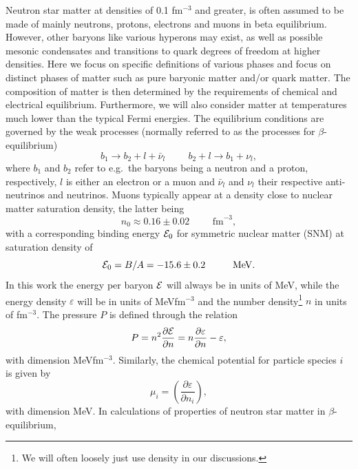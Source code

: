 \documentclass[%
oneside,                 %
final,                   %
10pt]{article}
\begin{document}
Neutron star matter
at densities of  0.1 fm$^{-3}$ and greater, is often assumed to 
be made of mainly neutrons, protons, electrons and 
muons in beta equilibrium. However, other baryons like various hyperons may exist, as well as possible mesonic condensates and transitions to quark degrees of freedom at higher densities. 
Here we focus on specific definitions of various phases and focus 
on distinct phases of matter such as pure baryonic
matter and/or quark matter.
The composition of matter is then 
determined by the requirements of chemical and electrical equilibrium.
Furthermore, we will also consider matter at temperatures much lower
than the typical Fermi energies.
The equilibrium conditions are governed by the weak processes 
(normally referred to as the processes
for $\beta$-equilibrium)
\begin{equation} 
      b_1 \rightarrow b_2 + l +\bar{\nu}_l \hspace{1cm} b_2 +l \rightarrow b_1 
+\nu_l,
      \label{eq:betadecay}
\end{equation}
where $b_1$ and $b_2$ refer to e.g.\  the baryons being a neutron and a proton, 
respectively, 
$l$ is either an electron or a muon and  $\bar{\nu}_l $
and $\nu_l$ their respective anti-neutrinos and neutrinos. Muons typically 
appear at
a density close to nuclear matter saturation density, the latter being
\[
     n_0 \approx 0.16 \pm 0.02 \hspace{1cm} \mathrm{fm}^{-3},
\]
with a corresponding binding energy ${\cal E}_0$ 
for symmetric nuclear matter (SNM) at saturation density of
\[
     {\cal E}_0 = B/A=-15.6\pm 0.2 \hspace{1cm} \mathrm{MeV}.
\]
In this work the energy per baryon ${\cal E}$ will always be in units of MeV, 
while
the energy density $\varepsilon$ will 
be in units of MeVfm$^{-3}$ and the number density\footnote{We will often 
loosely just use density in our discussions.}
$n$ in units of fm$^{-3}$. The pressure $P$ is 
defined through the relation
\begin{equation}
    P=n^2\frac{\partial {\cal E}}{\partial n}=
      n\frac{\partial \varepsilon}{\partial n}-\varepsilon,
\end{equation}
with 
dimension MeVfm$^{-3}$. 
Similarly, the chemical potential for particle species $i$
is given by
\begin{equation}
     \mu_i = \left(\frac{\partial \varepsilon}{\partial n_i}\right),
     \label{eq:chemicalpotdef}
\end{equation}
with dimension MeV.
In calculations of properties of neutron star matter in $\beta$-equilibrium,
\end{document}
